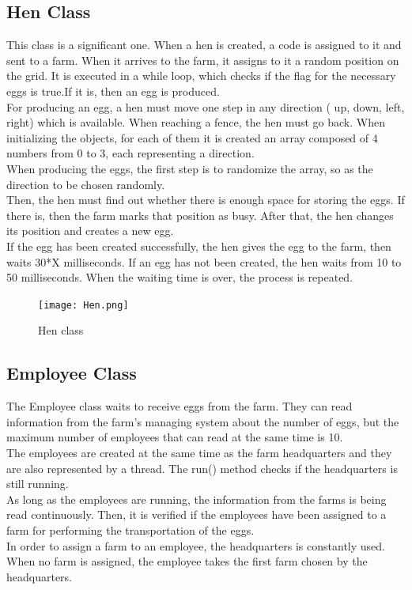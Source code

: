 \documentclass{article}
\begin{document}
\subsection{ Hen Class}
This class is a significant one. When a hen is created, a code is assigned to it and sent to a farm. When it arrives to the farm, it assigns to it a random position on the grid. It is executed in a while loop, which checks if the flag for the necessary eggs is true.If it is, then an egg is produced.
\\ 
For producing an egg, a hen must move one step in any direction ( up, down, left, right) which is available. When reaching a fence, the hen must go back. When initializing the objects, for each of them it is created an array composed of 4 numbers from 0 to 3, each representing a direction.
\\
When producing the eggs, the first step is to randomize the array, so as the direction to be chosen randomly.
\\
Then, the hen must find out whether there is enough space for storing the eggs. If there is, then the farm marks that position as busy. After that, the hen changes its position 
and  creates a new egg.
\\
If the egg has been created successfully, the hen gives the egg to the farm, then waits 30*X milliseconds. If an egg has not been created, the hen waits from 10 to 50 milliseconds.
When the waiting time is over, the process is repeated.
\\

\begin{figure}[htp]
    \centering
    \texttt{[image: Hen.png]}
    \caption{Hen class}
\end{figure}

\subsection{Employee Class}
The Employee class waits to receive eggs from the farm. They can read information from the farm's managing system about the number of eggs, but the maximum number of employees that can read at the same time is 10.
\\
The employees are created at the same time as the farm headquarters and they are also represented by a thread. The run() method checks if the headquarters is still running.
\\ 
As long as the employees are running, the information from the farms is being read continuously. Then, it is verified if the employees have been assigned to a farm for performing the transportation of the eggs.
\\
In order to assign a farm to an employee, the headquarters is constantly used. When no farm is assigned, the employee takes the first farm chosen by the headquarters.
\\
\end{document}
